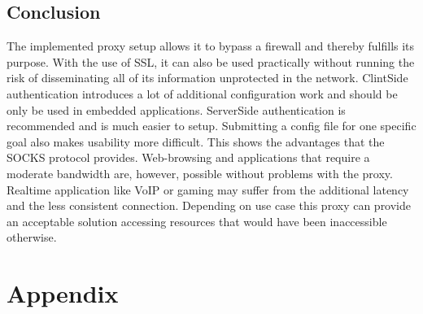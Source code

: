 \documentclass[12pt, a4paper]{scrartcl}
\begin{document}
\subsection{Conclusion}
The implemented proxy setup allows it to bypass a firewall and thereby fulfills its purpose. With the use of \ac{SSL}, it can also be used practically without running the risk of disseminating all of its information unprotected in the network. ClintSide authentication introduces a lot of additional configuration work and should be only be used in embedded applications. ServerSide authentication is recommended and is much easier to setup.\newline
Submitting a config file for one specific goal also makes usability more difficult. This shows the advantages that the SOCKS protocol provides. Web-browsing and applications that require a moderate bandwidth are, however, possible without problems with the proxy. Realtime application like \ac{VoIP} or gaming may suffer from the additional latency and the less consistent connection.\newline
Depending on use case this proxy can provide an acceptable solution accessing resources that would have been inaccessible otherwise.

\newpage
\renewcommand{\thesubsection}{\Alph{subsection}}
\setcounter{page}{\value{lastroman}}
\section*{Appendix}


\newpage
\listoffigures

\end{document}
